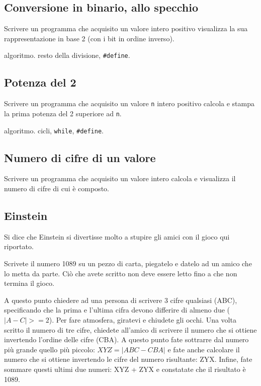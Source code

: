 \subsection{Conversione in binario, allo specchio}
Scrivere un programma che acquisito un valore intero positivo visualizza la sua rappresentazione in base 2 (con i bit in ordine inverso).

\begin{tags}
algoritmo. resto della divisione, \texttt{\#define}.
\end{tags}



\subsection{Potenza del 2}
Scrivere un programma che acquisito un valore \texttt{n} intero positivo calcola e stampa la prima potenza del 2 superiore ad \texttt{n}.

\begin{tags}
algoritmo. cicli, \texttt{while}, \texttt{\#define}.
\end{tags}



\subsection{Numero di cifre di un valore}
Scrivere un programma che acquisito un valore intero calcola e visualizza il numero di cifre di cui \`e composto.



\subsection{Einstein}
Si dice che Einstein si divertisse molto a stupire gli amici con il gioco qui riportato.

Scrivete il numero 1089 su un pezzo di carta, piegatelo e datelo ad un amico che lo metta da parte. Ci\`o che avete scritto non deve essere letto fino a che non termina il gioco.

A questo punto chiedere ad una persona di scrivere 3 cifre qualsiasi (ABC), specificando che la prima e l'ultima cifra devono differire di almeno due ($|A-C| >=2$). Per fare atmosfera, giratevi e chiudete gli occhi. Una volta scritto il numero di tre cifre, chiedete all'amico di scrivere il numero che si ottiene invertendo l'ordine delle cifre (CBA). A questo punto fate sottrarre dal numero pi\`u grande quello pi\`u piccolo: $XYZ = |ABC - CBA|$ e fate anche calcolare il numero che si ottiene invertendo le cifre del numero risultante: ZYX. Infine, fate sommare questi ultimi due numeri: XYZ + ZYX e constatate che il risultato \`e 1089.

